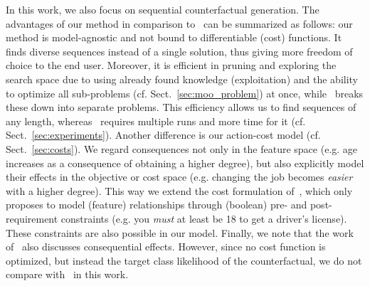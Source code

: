 \documentclass[runningheads, envcountsame, a4paper]{llncs}
\begin{document}
In this work, we also focus on sequential counterfactual generation. The advantages of our method in comparison to~\cite{ramakrishnanSynthesizingActionSequences2020} can be summarized as follows: our method is model-agnostic and not bound to differentiable (cost) functions.
It finds diverse sequences instead of a single solution, thus giving more freedom of choice to the end user. Moreover, it is efficient in pruning and exploring the search space due to using already found knowledge (exploitation) and the ability to optimize all sub-problems (cf. Sect.~\ref{sec:moo_problem}) at once, while~\cite{ramakrishnanSynthesizingActionSequences2020} breaks these down into separate problems. This efficiency allows us to find sequences of any length, whereas~\cite{ramakrishnanSynthesizingActionSequences2020} requires multiple runs and more time for it (cf. Sect.~\ref{sec:experiments}).
Another difference is our action-cost model (cf. Sect.~\ref{sec:costs}). We regard consequences not only in the feature space (e.g. age increases as a consequence of obtaining a higher degree), but also explicitly model their effects in the objective or cost space (e.g. changing the job becomes \emph{easier} with a higher degree).
This way we extend the cost formulation of~\cite{ramakrishnanSynthesizingActionSequences2020}, which only proposes to model (feature) relationships through (boolean) pre- and post-requirement constraints (e.g. you \emph{must} at least be 18 to get a driver's license). These constraints are also possible in our model. 
Finally, we note that the work of~\cite{shavitExtractingIncentivesBlackBox2019} also discusses consequential effects. However, since no cost function is optimized, but instead the target class likelihood of the counterfactual, we do not compare with~\cite{shavitExtractingIncentivesBlackBox2019} in this work.
\end{document}
